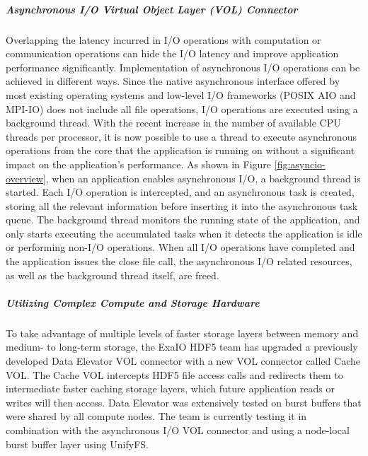 \subparagraph{Asynchronous I/O Virtual Object Layer (VOL) Connector} Overlapping the latency incurred in I/O operations with computation or communication operations can hide the I/O latency and improve application performance significantly. Implementation of asynchronous I/O operations can be achieved in different ways. Since the native asynchronous interface offered by most existing operating systems and low-level I/O frameworks (POSIX AIO and MPI-IO) does not include all file operations, I/O operations are executed using a background thread. With the recent increase in the number of available CPU threads per processor, it is now possible to use a thread to execute asynchronous operations from the core that the application is running on without a significant impact on the application's performance. As shown in Figure \ref{fig:asyncio-overview}, when an application enables asynchronous I/O, a background thread is started. Each I/O operation is intercepted, and an asynchronous task is created, storing all the relevant information before inserting it into the asynchronous task queue. The background thread monitors the running state of the application, and only starts executing the accumulated tasks when it detects the application is idle or performing non-I/O operations. When all I/O operations have completed and the application issues the close file call, the asynchronous I/O related resources, as well as the background thread itself, are freed.

\subparagraph{Utilizing Complex Compute and Storage Hardware} 
To take advantage of multiple levels of faster storage layers between memory and medium- to long-term storage, the ExaIO HDF5 team has upgraded a previously developed Data Elevator VOL connector with a new VOL connector called Cache VOL. The Cache VOL intercepts HDF5 file access calls and redirects them to intermediate faster caching storage layers, which future application reads or writes will then access. Data Elevator was extensively tested on burst buffers that were shared by all compute nodes. The team is currently testing it in combination with the asynchronous I/O VOL connector and using a node-local burst buffer layer using UnifyFS. 


